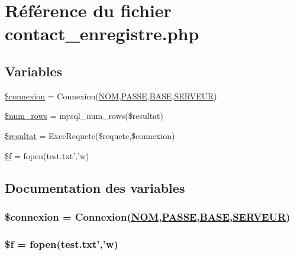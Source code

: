 \hypertarget{contact__enregistre_8php}{
\section{R\'{e}f\'{e}rence du fichier contact\_\-enregistre.php}
\label{contact__enregistre_8php}
}
\subsection*{Variables}
\begin{CompactItemize}
\item 
\hyperlink{contact__enregistre_8php_a0}{\$connexion} = Connexion(\hyperlink{pma__connect_8php_a0}{NOM},\hyperlink{pma__connect_8php_a1}{PASSE},\hyperlink{pma__connect_8php_a3}{BASE},\hyperlink{pma__connect_8php_a2}{SERVEUR})
\item 
\hyperlink{contact__enregistre_8php_a1}{\$num\_\-rows} = mysql\_\-num\_\-rows(\$resultat)
\item 
\hyperlink{contact__enregistre_8php_a2}{\$resultat} = Exec\-Requete(\$requete,\$connexion)
\item 
\hyperlink{contact__enregistre_8php_a3}{\$f} = fopen(test.txt','w)
\end{CompactItemize}


\subsection{Documentation des variables}
\hypertarget{contact__enregistre_8php_a0}{
\subsubsection[\$connexion]{\setlength{\rightskip}{0pt plus 5cm}\$connexion = Connexion(\hyperlink{pma__connect_8php_a0}{NOM},\hyperlink{pma__connect_8php_a1}{PASSE},\hyperlink{pma__connect_8php_a3}{BASE},\hyperlink{pma__connect_8php_a2}{SERVEUR})}}
\label{contact__enregistre_8php_a0}


\hypertarget{contact__enregistre_8php_a3}{
\subsubsection[\$f]{\setlength{\rightskip}{0pt plus 5cm}\$f = fopen(test.txt','w)}}
\label{contact__enregistre_8php_a3}



